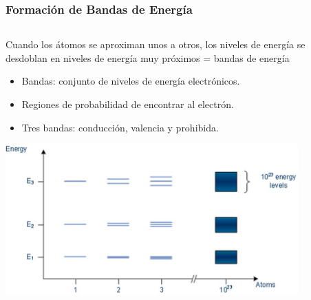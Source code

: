 \documentclass[10pt,t,aspectratio=169]{beamer}
\begin{document}
\begin{frame}[t]
    \frametitle{Formación de Bandas de Energía}

    \begin{columns}
    
        \begin{column}[]{0.6\textwidth}
        
            Cuando los átomos se aproximan unos a otros, los niveles de energía se desdoblan en niveles de energía muy próximos = bandas de energía
            \begin{itemize}
                \item Bandas: conjunto de niveles de energía electrónicos.
                \item Regiones de probabilidad de encontrar al electrón.
                \item Tres bandas: conducción, valencia y prohibida.
            \end{itemize}

            \vspace{3mm}
            \centering
            \includegraphics[width=0.88\textwidth]{./figures/formacion-bandas-2.jpg}
            
        \end{column}
        
    \begin{column}[]{0.4\textwidth}
    

\end{column}
\end{columns}
\end{frame}
\end{document}
